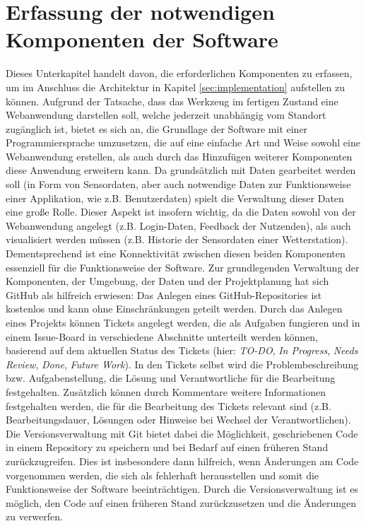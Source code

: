 \section{Erfassung der notwendigen Komponenten der Software}
Dieses Unterkapitel handelt davon, die erforderlichen Komponenten zu erfassen, um im Anschluss die Architektur in Kapitel \ref{sec:implementation} aufstellen zu können. \newline Aufgrund der Tatsache, dass das Werkzeug im fertigen Zustand eine Webanwendung darstellen soll, welche jederzeit unabhängig vom Standort zugänglich ist, bietet es sich an, die Grundlage der Software mit einer Programmiersprache umzusetzen, die auf eine einfache Art und Weise sowohl eine Webanwendung erstellen, als auch durch das Hinzufügen weiterer Komponenten diese Anwendung erweitern kann. \newline Da grundsätzlich mit Daten gearbeitet werden soll (in Form von Sensordaten, aber auch notwendige Daten zur Funktionsweise einer Applikation, wie z.B. Benutzerdaten) spielt die Verwaltung dieser Daten eine große Rolle. Dieser Aspekt ist insofern wichtig, da die Daten sowohl von der Webanwendung angelegt (z.B. Login-Daten, Feedback der Nutzenden), als auch visualisiert werden müssen (z.B. Historie der Sensordaten einer Wetterstation). Dementsprechend ist eine Konnektivität zwischen diesen beiden Komponenten essenziell für die Funktionsweise der Software. \newline Zur grundlegenden Verwaltung der Komponenten, der Umgebung, der Daten und der Projektplanung hat sich GitHub als hilfreich erwiesen: Das Anlegen eines GitHub-Repositories ist kostenlos und kann ohne Einschränkungen geteilt werden. Durch das Anlegen eines Projekts können Tickets angelegt werden, die als Aufgaben fungieren und in einem Issue-Board in verschiedene Abschnitte unterteilt werden können, basierend auf dem aktuellen Status des Tickets (hier: \textit{TO-DO}, \textit{In Progress}, \textit{Needs Review}, \textit{Done}, \textit{Future Work}). In den Tickets selbst wird die Problembeschreibung bzw. Aufgabenstellung, die Lösung und Verantwortliche für die Bearbeitung festgehalten. Zusätzlich können durch Kommentare weitere Informationen festgehalten werden, die für die Bearbeitung des Tickets relevant sind (z.B. Bearbeitungsdauer, Lösungen oder Hinweise bei Wechsel der Verantwortlichen). \newline Die Versionsverwaltung mit Git bietet dabei die Möglichkeit, geschriebenen Code in einem Repository zu speichern und bei Bedarf auf einen früheren Stand zurückzugreifen. Dies ist insbesondere dann hilfreich, wenn Änderungen am Code vorgenommen werden, die sich als fehlerhaft herausstellen und somit die Funktionsweise der Software beeinträchtigen. Durch die Versionsverwaltung ist es möglich, den Code auf einen früheren Stand zurückzusetzen und die Änderungen zu verwerfen. 


